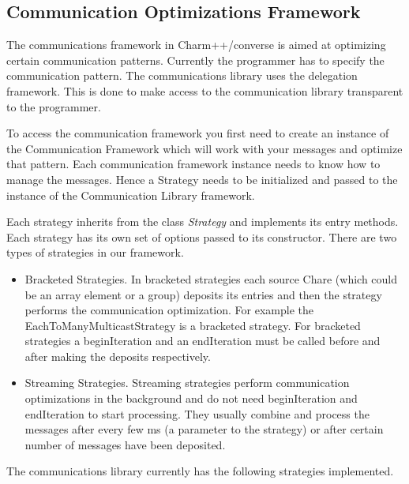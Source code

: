 \subsection{Communication Optimizations Framework}

The communications framework in Charm++/converse is aimed at
optimizing certain communication patterns. Currently the programmer
has to specify the communication pattern. The communications library
uses the delegation framework. This is done to make access to the
communication library transparent to the programmer.

To access the communication framework you first need to create an
instance of the Communication Framework which will work with your
messages and optimize that pattern. Each communication framework
instance needs to know how to manage the messages. Hence a Strategy
needs to be initialized and passed to the instance of the
Communication Library framework.

Each strategy inherits from the class {\em Strategy} and implements
its entry methods.  Each strategy has its own set of options passed to
its constructor. There are two types of strategies in our framework.

\begin{itemize}

\item Bracketed Strategies. In bracketed strategies each source Chare
(which could be an array element or a group) deposits its entries and
then the strategy performs the communication optimization. For example
the EachToManyMulticastStrategy is a bracketed strategy. For bracketed
strategies a beginIteration and an endIteration must be called before
and after making the deposits respectively. 

\item Streaming Strategies. Streaming strategies perform communication
optimizations in the background and do not need beginIteration and
endIteration to start processing. They usually combine and process
the messages after every few ms (a parameter to the strategy) or after
certain number of messages have been deposited.

\end{itemize}

The communications library currently has the following strategies
implemented.

